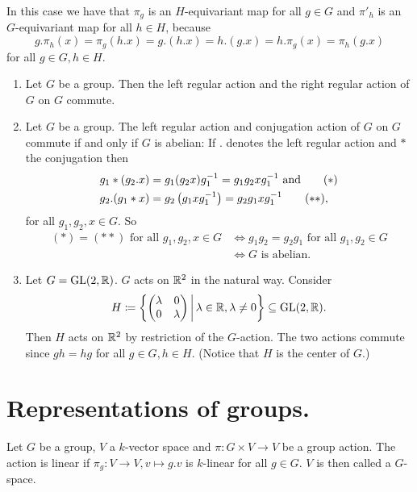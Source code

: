 \begin{rem}
 In this case we have that $\pi_g$ is an $H$-equivariant map for all $g \in G$ and $\pi'_h$ is an $G$-equivariant map for all $h \in H$, because
 \[
  g.\pi_h(x) = \pi_g(h.x) = g.(h.x) = h.(g.x) = h.\pi_g(x) = \pi_h(g.x)
 \]
 for all $g \in G, h \in H$.
\end{rem}


\begin{expls}
 \begin{enumerate}[label=\emph{\alph*})]
  \item
   Let $G$ be a group. Then the left regular action and the right regular action of $G$ on $G$ commute.
  \item
   Let $G$ be a group. The left regular action and conjugation action of $G$ on $G$ commute if and only if $G$ is abelian: If $.$ denotes the left regular action and $*$ the conjugation then
   \begin{align*}
    g_1*(g_2.x) &= g_1 (g_2 x) g_1^{-1} = g_1 g_2 x g_1^{-1} \text{ and} \tag{\ensuremath{\ast}}\\
    g_2.(g_1*x) &= g_2 \left(g_1 x g_1^{-1}\right) = g_2 g_1 x g_1^{-1} \tag{\ensuremath{\ast\ast}},
   \end{align*}
   for all $g_1, g_2, x \in G$. So
   \begin{align*}
    (\ast) = (\ast\ast) \text{ for all } g_1, g_2, x \in G
    &\Leftrightarrow g_1 g_2 = g_2 g_1 \text{ for all } g_1, g_2 \in G \\
    &\Leftrightarrow \text{$G$ is abelian}.
   \end{align*}
  \item
   Let $G = \operatorname{GL}(2,\mathbb{R})$. $G$ acts on $\mathbb{R}^2$ in the natural way. Consider
   \[
    H \coloneqq \left\{ \begin{pmatrix}\lambda&0\\0&\lambda\end{pmatrix} \,\middle|\, \lambda \in \mathbb{R}, \lambda \neq 0 \right\} \subseteq \operatorname{GL}(2,\mathbb{R}).
   \]
   Then $H$ acts on $\mathbb{R}^2$ by restriction of the $G$-action. The two actions commute since $gh = hg$ for all $g \in G, h \in H$. (Notice that $H$ is the center of $G$.)
 \end{enumerate}
\end{expls}





\section{Representations of groups.}


\begin{defi}
 Let $G$ be a group, $V$ a $k$-vector space and $\pi \colon G \times V \to V$ be a group action. The action is linear if $\pi_g \colon V \to V, v \mapsto g.v$ is $k$-linear for all $g \in G$. $V$ is then called a $G$-space.
\end{defi}


